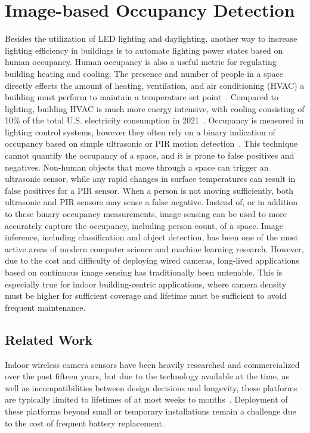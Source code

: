 \section{Image-based Occupancy Detection}
Besides the utilization of LED lighting and daylighting, another way to increase lighting efficiency in buildings is to automate lighting power states based on human occupancy.
Human occupancy is also a useful metric for regulating building heating and cooling.
The presence and number of people in a space directly effects the amount of heating, ventilation, and air conditioning (HVAC) a building must perform to maintain a temperature set point~\cite{wei2020deep}.
Compared to lighting, building HVAC is much more energy intensive, with cooling consisting of 10\% of the total U.S. electricity consumption in 2021~\cite{aeo2022}. 
Occupancy is measured in lighting control systems, however they often rely on a binary indication of occupancy based on simple ultrasonic or PIR motion detection~\cite{levitonDecora}.
This technique cannot quantify the occupancy of a space, and it is prone to false positives and negatives.
Non-human objects that move through a space can trigger an ultrasonic sensor, while any rapid changes in surface temperatures can result in false positives for a PIR sensor.
When a person is not moving sufficiently, both ultrasonic and PIR sensors may sense a false negative.
Instead of, or in addition to these binary occupancy measurements, image sensing can be used to more accurately capture the occupancy, including person count, of a space.
Image inference, including classification and object detection, has been one of the most active areas of modern computer science and machine learning research. 
However, due to the cost and difficulty of deploying wired cameras, long-lived applications based on continuous image sensing has traditionally been untenable.
This is especially true for indoor building-centric applications, where camera density must be higher for sufficient coverage and lifetime must be sufficient to avoid frequent maintenance.

\subsection{Related Work}
Indoor wireless camera sensors have been heavily researched and commercialized over the past fifteen years, but due to the technology available at the time, as well as incompatibilities between design decisions and longevity, these platforms are typically limited to lifetimes of at most weeks to months~\cite{rowe2007firefly,rahimi2005cyclops,blinkindoor,wyzeoutdoor,josephson2019wireless}. 
Deployment of these platforms beyond small or temporary installations remain a challenge due to the cost of frequent battery replacement.

